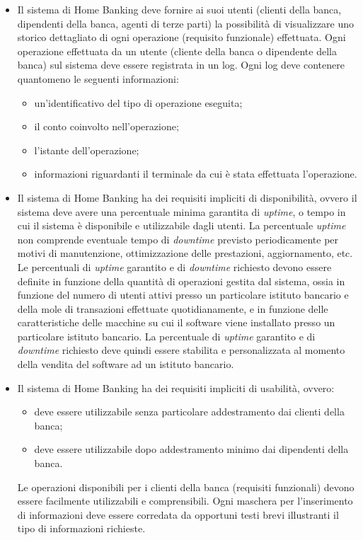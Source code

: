 \begin{itemize}
	\item Il sistema di Home Banking deve fornire ai suoi utenti (clienti della banca, dipendenti della banca, agenti di terze parti) la possibilit\`a di visualizzare uno storico dettagliato di ogni operazione (requisito funzionale) effettuata.
	Ogni operazione effettuata da un utente (cliente della banca o dipendente della banca) sul sistema deve essere registrata in un log.
	Ogni log deve contenere quantomeno le seguenti informazioni:
	\begin{itemize}
		\item un'identificativo del tipo di operazione eseguita;
		\item il conto coinvolto nell'operazione;
		\item l'istante dell'operazione;
		\item informazioni riguardanti il terminale da cui \`e stata effettuata l'operazione.
	\end{itemize}

	\item Il sistema di Home Banking ha dei requisiti impliciti di disponibilit\`a, ovvero il sistema deve avere una percentuale minima garantita di \emph{uptime}, o tempo in cui il sistema \`e disponibile e utilizzabile dagli utenti.
	La percentuale \emph{uptime} non comprende eventuale tempo di \emph{downtime} previsto periodicamente per motivi di manutenzione, ottimizzazione delle prestazioni, aggiornamento, etc.
	Le percentuali di \emph{uptime} garantito e di \emph{downtime} richiesto devono essere definite in funzione della quantit\`a di operazioni gestita dal sistema, ossia in funzione del numero di utenti attivi presso un particolare istituto bancario e della mole di transazioni effettuate quotidianamente, e in funzione delle caratteristiche delle macchine su cui il software viene installato presso un particolare istituto bancario.
	La percentuale di \emph{uptime} garantito e di \emph{downtime} richiesto deve quindi essere stabilita e personalizzata al momento della vendita del software ad un istituto bancario.

	\item Il sistema di Home Banking ha dei requisiti impliciti di usabilit\`a, ovvero:
	\begin{itemize}
		\item deve essere utilizzabile senza particolare addestramento dai clienti della banca;
		\item deve essere utilizzabile dopo addestramento minimo dai dipendenti della banca.
	\end{itemize}
	Le operazioni disponibili per i clienti della banca (requisiti funzionali) devono essere facilmente utilizzabili e comprensibili.
	Ogni maschera per l'inserimento di informazioni deve essere corredata da opportuni testi brevi illustranti il tipo di informazioni richieste.
\end{itemize}

